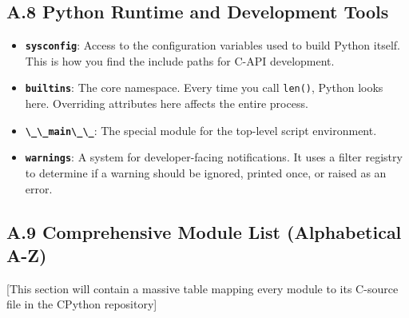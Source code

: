 \hypertarget{a.8-python-runtime-and-development-tools}{%
\subsection{A.8 Python Runtime and Development
Tools}\label{a.8-python-runtime-and-development-tools}}

\begin{itemize}
\tightlist
\item
  \textbf{\passthrough{\lstinline!sysconfig!}}: Access to the
  configuration variables used to build Python itself. This is how you
  find the include paths for C-API development.
\item
  \textbf{\passthrough{\lstinline!builtins!}}: The core namespace. Every
  time you call \passthrough{\lstinline!len()!}, Python looks here.
  Overriding attributes here affects the entire process.
\item
  \textbf{\passthrough{\lstinline!\_\_main\_\_!}}: The special module
  for the top-level script environment.
\item
  \textbf{\passthrough{\lstinline!warnings!}}: A system for
  developer-facing notifications. It uses a filter registry to determine
  if a warning should be ignored, printed once, or raised as an error.
\end{itemize}

\hypertarget{a.9-comprehensive-module-list-alphabetical-a-z}{%
\subsection{A.9 Comprehensive Module List (Alphabetical
A-Z)}\label{a.9-comprehensive-module-list-alphabetical-a-z}}

{[}This section will contain a massive table mapping every module to its
C-source file in the CPython repository{]}

